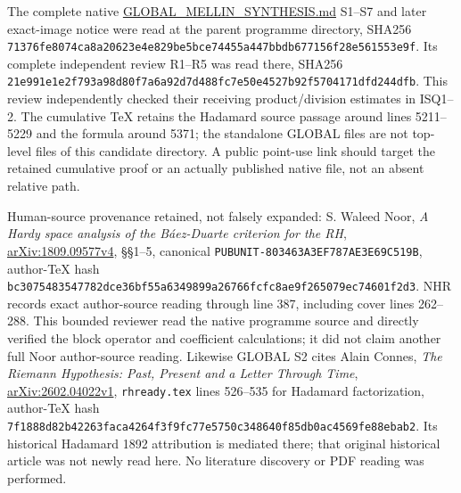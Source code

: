 \documentclass[
]{article}
\begin{document}
The complete native \href{https://github.com/KokunoYumeto/zeta-function-research-reader/blob/96b02efaf4511d07f33de5ea4cfb10058e905d7e/workbenches/splitzero-tandem/continuations/20260924-cohomology-weight-and-character-lifts/gct-weight-control/proofs/GLOBAL_MELLIN_SYNTHESIS.md}{GLOBAL\_MELLIN\_SYNTHESIS.md} S1--S7 and later exact-image notice were read at the parent programme directory, SHA256 \texttt{71376fe8074ca8a20623e4e829be5bce74455a447bbdb677156f28e561553e9f}. Its complete independent review R1--R5 was read there, SHA256 \texttt{21e991e1e2f793a98d80f7a6a92d7d488fc7e50e4527b92f5704171dfd244dfb}. This review independently checked their receiving product/division estimates in ISQ1--2. The cumulative TeX retains the Hadamard source passage around lines 5211--5229 and the formula around 5371; the standalone GLOBAL files are not top-level files of this candidate directory. A public point-use link should target the retained cumulative proof or an actually published native file, not an absent relative path.

Human-source provenance retained, not falsely expanded: S. Waleed Noor, \emph{A Hardy space analysis of the Báez-Duarte criterion for the RH}, \href{https://arxiv.org/abs/1809.09577v4}{arXiv:1809.09577v4}, §§1--5, canonical \texttt{PUBUNIT-803463A3EF787AE3E69C519B}, author-TeX hash \texttt{bc3075483547782dce36bf55a6349899a26766fcfc8ae9f265079ec74601f2d3}. NHR records exact author-source reading through line 387, including cover lines 262--288. This bounded reviewer read the native programme source and directly verified the block operator and coefficient calculations; it did not claim another full Noor author-source reading. Likewise GLOBAL S2 cites Alain Connes, \emph{The Riemann Hypothesis: Past, Present and a Letter Through Time}, \href{https://arxiv.org/abs/2602.04022v1}{arXiv:2602.04022v1}, \texttt{rhready.tex} lines 526--535 for Hadamard factorization, author-TeX hash \texttt{7f1888d82b42263faca4264f3f9fc77e5750c348640f85db0ac4569fe88ebab2}. Its historical Hadamard 1892 attribution is mediated there; that original historical article was not newly read here. No literature discovery or PDF reading was performed.
\end{document}
